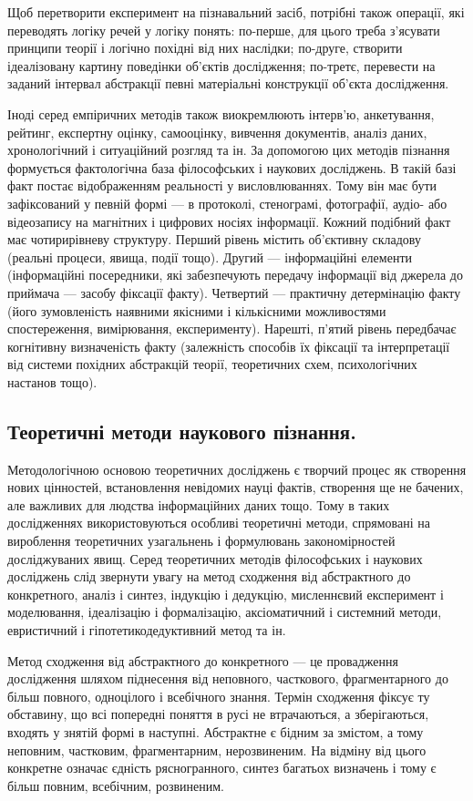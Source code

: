 Щоб перетворити експеримент на пізнавальний засіб, потрібні також
операції, які переводять логіку речей у логіку понять: по-перше, для цього
треба з’ясувати принципи теорії і логічно похідні від них наслідки; по-друге,
створити ідеалізовану картину поведінки об’єктів дослідження; по-третє,
перевести на заданий інтервал абстракції певні матеріальні конструкції об’єкта
дослідження.

Іноді серед емпіричних методів також виокремлюють інтерв’ю,
анкетування, рейтинг, експертну оцінку, самооцінку, вивчення документів,
аналіз даних, хронологічний і ситуаційний розгляд та ін. За допомогою цих
методів пізнання формується фактологічна база філософських і наукових
досліджень. В такій базі факт постає відображенням реальності у
висловлюваннях. Тому він має бути зафіксований у певній формі --- в протоколі,
стенограмі, фотографії, аудіо- або відеозапису на магнітних і цифрових носіях
інформації. Кожний подібний факт має чотирирівневу структуру. Перший
рівень містить об’єктивну складову (реальні процеси, явища, події тощо).
Другий --- інформаційні елементи (інформаційні посередники, які забезпечують
передачу інформації від джерела до приймача --- засобу фіксації факту).
Четвертий --- практичну детермінацію факту (його зумовленість наявними
якісними і кількісними можливостями спостереження, вимірювання,
експерименту). Нарешті, п’ятий рівень передбачає когнітивну визначеність
факту (залежність способів їх фіксації та інтерпретації від системи похідних
абстракцій теорії, теоретичних схем, психологічних настанов тощо).

\subsection{Теоретичні методи наукового пізнання.} Методологічною основою
теоретичних досліджень є творчий процес як створення нових цінностей,
встановлення невідомих науці фактів, створення ще не бачених, але важливих
для людства інформаційних даних тощо. Тому в таких дослідженнях
використовуються особливі теоретичні методи, спрямовані на вироблення
теоретичних узагальнень і формулювань закономірностей досліджуваних явищ.
Серед теоретичних методів філософських і наукових досліджень слід звернути
увагу на метод сходження від абстрактного до конкретного, аналіз і синтез,
індукцію і дедукцію, мисленнєвий експеримент і моделювання, ідеалізацію і
формалізацію, аксіоматичний і системний методи, евристичний і гіпотетикодедуктивний метод та ін.

Метод сходження від абстрактного до конкретного --- це провадження
дослідження шляхом піднесення від неповного, часткового, фрагментарного до
більш повного, одноцілого і всебічного знання. Термін сходження фіксує ту
обставину, що всі попередні поняття в русі не втрачаються, а зберігаються,
входять у знятій формі в наступні. Абстрактне є бідним за змістом, а тому
неповним, частковим, фрагментарним, нерозвиненим. На відміну від цього
конкретне означає єдність рясногранного, синтез багатьох визначень і тому є
більш повним, всебічним, розвиненим.

